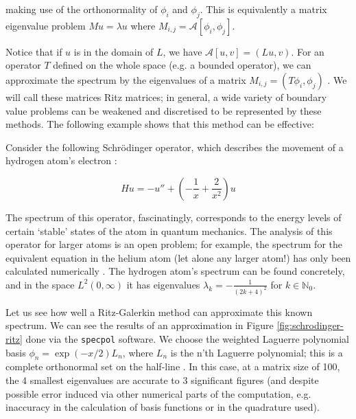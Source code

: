 \documentclass[../main.tex]{subfiles}
\begin{document}
making use of the orthonormality of $\phi_i$ and $\phi_j$. This is equivalently a matrix eigenvalue problem $M u = \lambda u$ where $M_{i,j} = \mathcal{A}[\phi_i, \phi_j]$.

Notice that if $u$ is in the domain of $L$, we have $\mathcal{A}[u, v] = (Lu, v)$. For an operator $T$ defined on the whole space (e.g. a bounded operator), we can approximate the spectrum by the eigenvalues of a matrix $M_{i, j} = (T \phi_i, \phi_j)$ \cite{davies2003spectral}. We will call these matrices Ritz matrices;  in general, a wide variety of boundary value problems can be weakened and discretised to be represented
by these methods. The following example shows that this method can be effective:

\begin{example}\label{ex:schrodinger-ritz}
Consider the following Schr\"odinger operator, which describes the movement of a hydrogen atom's electron \cite{pryce1993numerical}:

$$Hu = -u'' + (-\frac{1}{x} + \frac{2}{x^2})u$$
\end{example}

The spectrum of this operator, fascinatingly, corresponds to the energy levels of certain `stable' states of the atom in quantum mechanics. 
The analysis of this operator for larger atoms is an open problem; for example,
the spectrum for the equivalent equation in the helium atom (let alone any larger atom!) has only been calculated numerically \cite{davies1995spectral}. The hydrogen atom's
spectrum can be found concretely, and in the space $L^2(0, \infty)$ it has eigenvalues $\lambda_k = -\frac{1}{(2k + 4)^2}$ for $k \in \mathbb{N}_0$.

Let us see how well a Ritz-Galerkin method can approximate this known spectrum. We can see the results of an approximation in Figure \ref{fig:schrodinger-ritz} done via the \texttt{specpol} software. We choose the weighted Laguerre polynomial basis $\phi_n = \exp(-x/2)L_n$, where $L_n$ is the n'th Laguerre polynomial; this is a complete orthonormal set on the half-line \cite{szego1975orthogonal}.
 In this case, at a matrix size of 100, the 4 smallest eigenvalues are accurate to 3 significant figures (and despite possible error induced via other numerical parts of the computation, e.g. inaccuracy in the calculation of basis functions or in the quadrature used).
 
\end{document}
